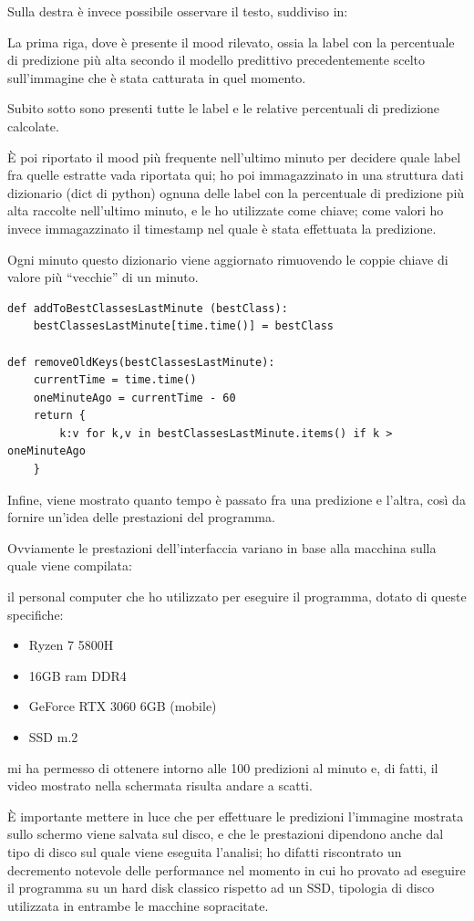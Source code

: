 Sulla destra è invece possibile osservare il testo, suddiviso in:

La prima riga, dove è presente il mood rilevato, ossia la label con la percentuale di predizione più alta secondo il modello predittivo precedentemente scelto sull’immagine che è stata catturata in quel momento.

Subito sotto sono presenti tutte le label e le relative percentuali di predizione calcolate.

È poi riportato il mood più frequente nell’ultimo minuto per decidere quale label fra quelle estratte vada riportata qui; ho poi immagazzinato in una struttura dati dizionario (dict di python) ognuna delle label con la percentuale di predizione più alta raccolte nell’ultimo minuto, e le ho utilizzate come chiave; come valori ho invece immagazzinato il timestamp nel quale è stata effettuata la predizione.

Ogni minuto questo dizionario viene aggiornato rimuovendo le coppie chiave di valore più “vecchie” di un minuto. 
\begin{verbatim}
def addToBestClassesLastMinute (bestClass):
    bestClassesLastMinute[time.time()] = bestClass

def removeOldKeys(bestClassesLastMinute):
    currentTime = time.time()
    oneMinuteAgo = currentTime - 60
    return {
        k:v for k,v in bestClassesLastMinute.items() if k > oneMinuteAgo
    }
\end{verbatim}
Infine, viene mostrato quanto tempo è passato fra una predizione e l’altra, così da fornire un’idea delle prestazioni del programma.

Ovviamente le prestazioni dell’interfaccia variano in base alla macchina sulla quale viene compilata:

il personal computer che ho utilizzato per eseguire il programma, dotato di queste specifiche:
\begin{itemize}
    \item Ryzen 7 5800H
    \item 16GB ram DDR4
    \item GeForce RTX 3060 6GB (mobile)
    \item SSD m.2
\end{itemize}

mi ha permesso di ottenere intorno alle 100 predizioni al minuto e, di fatti, il video mostrato nella schermata risulta andare a scatti.

È importante mettere in luce che per effettuare le predizioni l’immagine mostrata sullo schermo viene salvata sul disco, e che le prestazioni dipendono anche dal tipo di disco sul quale viene eseguita l’analisi; ho difatti riscontrato un decremento notevole delle performance nel momento in cui ho provato ad eseguire il programma su un hard disk classico rispetto ad un SSD, tipologia di disco utilizzata in entrambe le macchine sopracitate.


